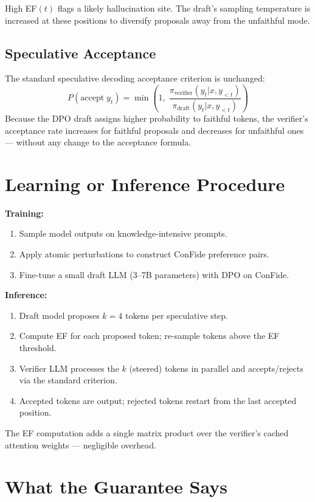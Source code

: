 \documentclass[10pt,twocolumn]{article}
\begin{document}
High EF$(t)$ flags a likely hallucination site. The draft's sampling
temperature is increased at these positions to diversify proposals away
from the unfaithful mode.

\subsection{Speculative Acceptance}

The standard speculative decoding acceptance criterion is unchanged:
\[
  P(\text{accept}\;y_t) = \min\!\left(1,\;
    \frac{\pi_\mathrm{verifier}(y_t|x, y_{<t})}{\pi_\mathrm{draft}(y_t|x, y_{<t})}\right)
\]
Because the DPO draft assigns higher probability to faithful tokens,
the verifier's acceptance rate increases for faithful proposals and
decreases for unfaithful ones --- without any change to the acceptance
formula.

\section{Learning or Inference Procedure}

\textbf{Training:}
\begin{enumerate}[itemsep=2pt,parsep=0pt]
  \item Sample model outputs on knowledge-intensive prompts.
  \item Apply atomic perturbations to construct ConFide preference pairs.
  \item Fine-tune a small draft LLM (3--7B parameters) with DPO on ConFide.
\end{enumerate}

\textbf{Inference:}
\begin{enumerate}[itemsep=2pt,parsep=0pt]
  \item Draft model proposes $k=4$ tokens per speculative step.
  \item Compute EF for each proposed token; re-sample tokens above the
    EF threshold.
  \item Verifier LLM processes the $k$ (steered) tokens in parallel
    and accepts/rejects via the standard criterion.
  \item Accepted tokens are output; rejected tokens restart from the
    last accepted position.
\end{enumerate}

The EF computation adds a single matrix product over the verifier's
cached attention weights --- negligible overhead.

\section{What the Guarantee Says}
\end{document}
